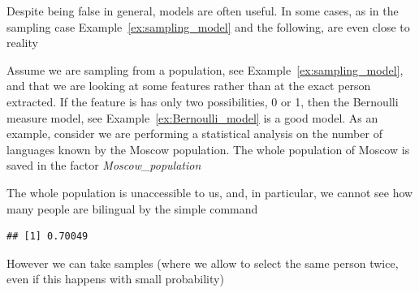 	 Despite being false in general, models are often useful. In some cases, as in the sampling case Example~\ref{ex:sampling_model} and the following, are even close to reality 
	 \begin{example}[Sampling 2]
		\label{ex:sampling_features}
	Assume we are sampling from a population, see Example~\ref{ex:sampling_model}, and that we are looking at some features rather than at the exact person extracted. If the feature is has only  two possibilities, 0 or 1, then the Bernoulli measure model, see Example~\ref{ex:Bernoulli_model} is a good model. As an example, consider we are performing a statistical analysis on the number of languages known by the Moscow population.  The whole population of Moscow is saved in the factor \textit{Moscow\_population}
\begin{knitrout}
\color{fgcolor}\begin{kframe}
\begin{alltt}
 \hlkwb{<-} \hldef{(}\hldef{,}\hldef{)}
 \hlkwb{<-}    \hldef{=}  \hldef{,}    \hldef{=} \hldef{(}\hldef{,} \hldef{)  )}
 \hlkwb{<-}   
\end{alltt}
\end{kframe}
\end{knitrout}
	The whole population is unaccessible to us, and, in particular, we cannot see how many people are bilingual by the simple command
\begin{knitrout}
\color{fgcolor}\begin{kframe}
\begin{alltt}
 \hlkwb{<-}  \hlopt{==} \hldef{)}
\end{alltt}
\begin{verbatim}
## [1] 0.70049
\end{verbatim}
\end{kframe}
\end{knitrout}
	However we can take samples (where we allow to select the same person twice, even if this happens with small probability)
\begin{knitrout}

\end{knitrout}
\end{example}
